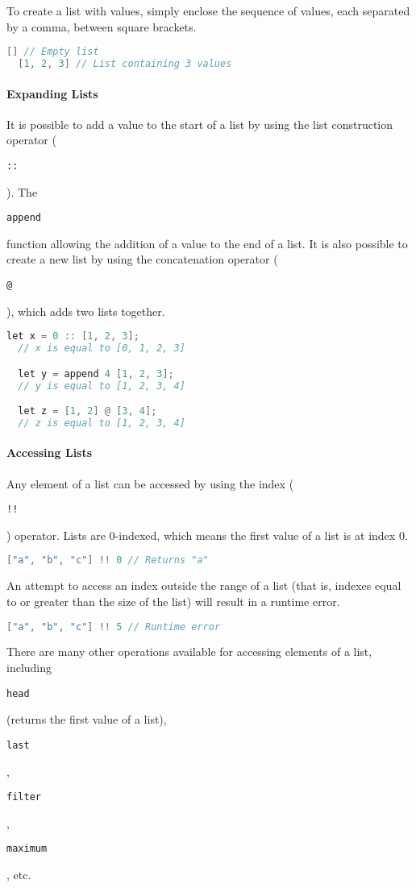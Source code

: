 \documentclass{article}
\def\code#1{\begin{footnotesize}\texttt{#1}\end{footnotesize}}
\begin{document}
To create a list with values, simply enclose the sequence of values, each separated by a comma, between square brackets.

\begin{lstlisting}[language=V]
  [] // Empty list
  [1, 2, 3] // List containing 3 values
\end{lstlisting}

\paragraph{Expanding Lists}

It is possible to add a value to the start of a list by using the list construction operator (\code{::}).
The \code{append} function allowing the addition of a value to the end of a list.
It is also possible to create a new list by using the concatenation operator (\code{@}), which adds two lists together.

\begin{lstlisting}[language=V]
  let x = 0 :: [1, 2, 3];
  // x is equal to [0, 1, 2, 3]

  let y = append 4 [1, 2, 3];
  // y is equal to [1, 2, 3, 4]

  let z = [1, 2] @ [3, 4];
  // z is equal to [1, 2, 3, 4]
\end{lstlisting}

\paragraph{Accessing Lists}

Any element of a list can be accessed by using the index (\code{!!}) operator.
Lists are 0-indexed, which means the first value of a list is at index 0.

\begin{lstlisting}[language=V]
  ["a", "b", "c"] !! 0 // Returns "a"
\end{lstlisting}

An attempt to access an index outside the range of a list (that is, indexes equal to or greater than the size of the list) will result in a runtime error.

\begin{lstlisting}[language=V]
  ["a", "b", "c"] !! 5 // Runtime error
\end{lstlisting}

There are many other operations available for accessing elements of a list, including \code{head} (returns the first value of a list), \code{last}, \code{filter}, \code{maximum}, etc.
\end{document}
